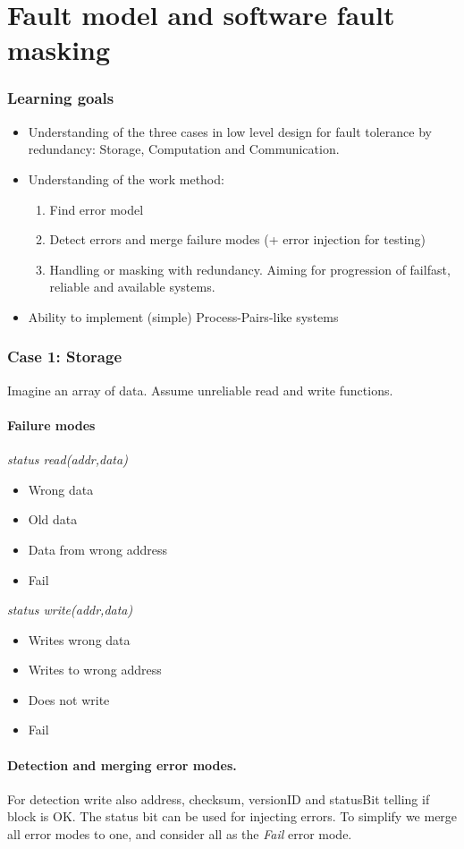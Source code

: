 \part{Fault model and software fault masking}
\section{Learning goals}
\begin{itemize}
\item Understanding of the three cases in low level design for fault tolerance by redundancy: Storage, Computation and Communication.
\item Understanding of the work method: \begin{enumerate}
\item  Find error model
\item Detect errors and merge failure modes (+ error injection for testing)
\item Handling or masking with redundancy. Aiming for progression of failfast, reliable and available systems.
\end{enumerate}
\item Ability to implement (simple) Process-Pairs-like systems
\end{itemize}

\section{Case 1: Storage}
Imagine an array of data. Assume unreliable read and write functions.
\subsection{Failure modes}
\textit{status read(addr,data)}
\begin{itemize}
\item Wrong data
\item Old data
\item Data from wrong address
\item Fail
\end{itemize}
\textit{status write(addr,data)}
\begin{itemize}
\item Writes wrong data
\item Writes to wrong address
\item Does not write
\item Fail
\end{itemize}
\subsection{Detection and merging error modes.}
For detection write also address, checksum, versionID and statusBit telling if block is OK. The status bit can be used for injecting errors. To simplify we merge all error modes to one, and consider all as the \textit{Fail} error mode.

